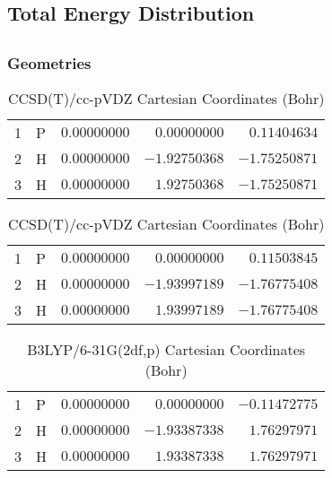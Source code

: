 \documentclass[10pt,oneside]{article}
\begin{document}
\begin{table}
\subsection*{Total Energy Distribution}
\centering\end{table}

\clearpage

\subsection{}

\begin{table}[h!]
\subsubsection*{Geometries}
\begin{multicols}{2}
\centering
\caption{CCSD(T)/cc-pVTZ Cartesian Coordinates (Bohr)}
\begin{tabular}{llrrr}
\toprule
1  & P  & $ 0.00000000$ & $ 0.00000000$ & $ 0.11404634$ \\
2  & H  & $ 0.00000000$ & $-1.92750368$ & $-1.75250871$ \\
3  & H  & $ 0.00000000$ & $ 1.92750368$ & $-1.75250871$ \\
\bottomrule
\end{tabular}
\caption{CCSD(T)/cc-pVDZ Cartesian Coordinates (Bohr)}
\begin{tabular}{llrrr}
\toprule
1  & P  & $ 0.00000000$ & $ 0.00000000$ & $ 0.11503845$ \\
2  & H  & $ 0.00000000$ & $-1.93997189$ & $-1.76775408$ \\
3  & H  & $ 0.00000000$ & $ 1.93997189$ & $-1.76775408$ \\
\bottomrule
\end{tabular}
\end{multicols}
\end{table}

\begin{table}[h]
\centering
\caption{B3LYP/6-31G(2df,p) Cartesian Coordinates (Bohr)}
\begin{tabular}{llrrr}
\toprule
1  & P  & $ 0.00000000$ & $ 0.00000000$ & $-0.11472775$ \\
2  & H  & $ 0.00000000$ & $-1.93387338$ & $ 1.76297971$ \\
3  & H  & $ 0.00000000$ & $ 1.93387338$ & $ 1.76297971$ \\
\bottomrule
\end{tabular}
\end{table}
\end{document}
